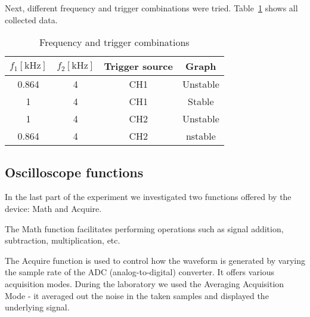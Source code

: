 Next, different frequency and trigger combinations were tried. Table~\ref{tab:triggering} shows all collected data.

\begin{table}[H]
	\centering
	\begin{tabular}{c|c|c|c}
		$f_{1} [\unit{\kilo\hertz}]$ & $f_{2} [\unit{\kilo\hertz}]$ & Trigger source & Graph\\
		\hline
		0.864 & 4 & CH1 & Unstable\\
		\hline
		1 & 4 & CH1 & Stable\\
		\hline
		1 & 4 & CH2 & Unstable\\
		\hline
		0.864 & 4 & CH2 & nstable\\
	\end{tabular}
	\caption{Frequency and trigger combinations}
	\label{tab:triggering}
\end{table}

\subsection{Oscilloscope functions}
In the last part of the experiment we investigated two functions offered by the device: Math and Acquire.

The Math function facilitates performing operations such as signal addition, subtraction, multiplication, etc.

The Acquire function is used to control how the waveform is generated by varying the sample rate of the ADC (analog-to-digital) converter. It offers various acquisition modes. During the laboratory we used the Averaging Acquisition Mode - it averaged out the noise in the taken samples and displayed the underlying signal.
